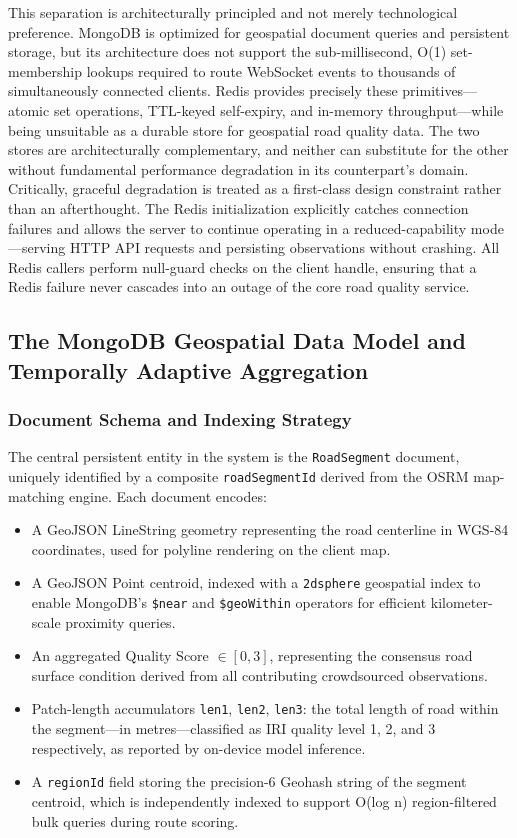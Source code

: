 \documentclass[conference]{IEEEtran}
\begin{document}
This separation is architecturally principled and not merely technological preference.
MongoDB is optimized for geospatial document queries and persistent storage, but its architecture does not support the sub-millisecond, O(1) set-membership lookups required to route WebSocket events to thousands of simultaneously connected clients.
Redis provides precisely these primitives---atomic set operations, TTL-keyed self-expiry, and in-memory throughput---while being unsuitable as a durable store for geospatial road quality data.
The two stores are architecturally complementary, and neither can substitute for the other without fundamental performance degradation in its counterpart's domain.
Critically, graceful degradation is treated as a first-class design constraint rather than an afterthought.
The Redis initialization explicitly catches connection failures and allows the server to continue operating in a reduced-capability mode---serving HTTP API requests and persisting observations without crashing. All Redis callers perform null-guard checks on the client handle, ensuring that a Redis failure never cascades into an outage of the core road quality service.

\subsection{The MongoDB Geospatial Data Model and Temporally Adaptive Aggregation}

\subsubsection{Document Schema and Indexing Strategy}
The central persistent entity in the system is the \texttt{RoadSegment} document, uniquely identified by a composite \texttt{roadSegmentId} derived from the OSRM map-matching engine. Each document encodes:
\begin{itemize}
    \item A GeoJSON LineString geometry representing the road 
centerline in WGS-84 coordinates, used for polyline rendering on the client map.
    \item A GeoJSON Point centroid, indexed with a \texttt{2dsphere} geospatial index to enable MongoDB's \texttt{\$near} and \texttt{\$geoWithin} operators for efficient kilometer-scale proximity queries.
    \item An aggregated Quality Score $\in [0, 3]$, representing the consensus road surface condition derived from all contributing crowdsourced observations.
    \item Patch-length accumulators \texttt{len1}, \texttt{len2}, \texttt{len3}: the total length of road within the segment---in metres---classified as IRI quality level 1, 2, and 3 respectively, as reported by on-device model inference.
    \item A \texttt{regionId} field storing the precision-6 Geohash string of the segment centroid, which is independently indexed to support O(log n) region-filtered bulk queries during route scoring.
\end{itemize}
\end{document}
